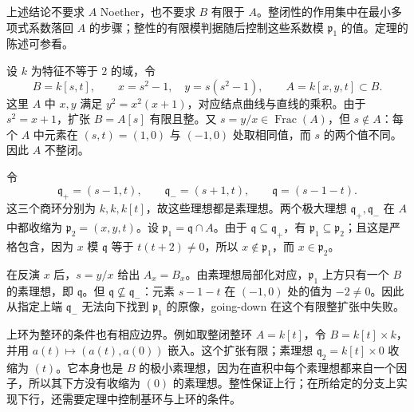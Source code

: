 上述结论不要求 \(A\) Noether，也不要求 \(B\) 有限于 \(A\)。整闭性的作用集中在最小多项式系数落回 \(A\) 的步骤；整性的有限模判据随后控制这些系数模 \(\mathfrak p_1\) 的值。定理的陈述可参看\cite[第9节，定理9.4(ii)，第68页]{Matsumura1989}。

\begin{example}
\label{g5:exm:going-down-nonnormal}
	设 \(k\) 为特征不等于 \(2\) 的域，令
	\[
		B=k[s,t],\qquad
		x=s^2-1,\quad y=s(s^2-1),\qquad
		A=k[x,y,t]\subset B.
	\]
	这里 \(A\) 中 \(x,y\) 满足 \(y^2=x^2(x+1)\)，对应结点曲线与直线的乘积。由于 \(s^2=x+1\)，扩张 \(B=A[s]\) 有限且整。又 \(s=y/x\in\operatorname{Frac}(A)\)，但 \(s\notin A\)：每个 \(A\) 中元素在 \((s,t)=(1,0)\) 与 \((-1,0)\) 处取相同值，而 \(s\) 的两个值不同。因此 \(A\) 不整闭。

	令
	\[
		\mathfrak q_+=(s-1,t),\qquad
		\mathfrak q_-=(s+1,t),\qquad
		\mathfrak q=(s-1-t).
	\]
	这三个商环分别为 \(k,k,k[t]\)，故这些理想都是素理想。两个极大理想 \(\mathfrak q_+,\mathfrak q_-\) 在 \(A\) 中都收缩为 \(\mathfrak p_2=(x,y,t)\)。设 \(\mathfrak p_1=\mathfrak q\cap A\)。由于 \(\mathfrak q\subseteq\mathfrak q_+\)，有 \(\mathfrak p_1\subseteq\mathfrak p_2\)；且这是严格包含，因为 \(x\) 模 \(\mathfrak q\) 等于 \(t(t+2)\ne0\)，所以 \(x\notin\mathfrak p_1\)，而 \(x\in\mathfrak p_2\)。

	在反演 \(x\) 后，\(s=y/x\) 给出 \(A_x=B_x\)。由素理想局部化对应，\(\mathfrak p_1\) 上方只有一个 \(B\) 的素理想，即 \(\mathfrak q\)。但 \(\mathfrak q\not\subseteq\mathfrak q_-\)：元素 \(s-1-t\) 在 \((-1,0)\) 处的值为 \(-2\ne0\)。因此从指定上端 \(\mathfrak q_-\) 无法向下找到 \(\mathfrak p_1\) 的原像，going-down 在这个有限整扩张中失败。
\end{example}

上环为整环的条件也有相应边界。例如取整闭整环 \(A=k[t]\)，令 \(B=k[t]\times k\)，并用 \(a(t)\mapsto(a(t),a(0))\) 嵌入。这个扩张有限；素理想 \(\mathfrak q_2=k[t]\times0\) 收缩为 \((t)\)。它本身也是 \(B\) 的极小素理想，因为在直积中每个素理想都来自一个因子，所以其下方没有收缩为 \((0)\) 的素理想。整性保证上行；在所给定的分支上实现下行，还需要定理中控制基环与上环的条件。

